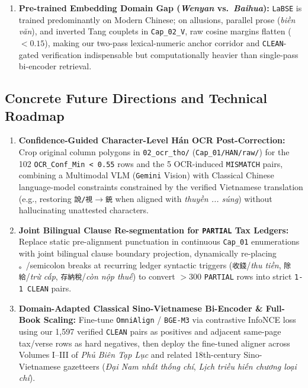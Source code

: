 \documentclass[a4paper]{article}
\begin{document}
\begin{enumerate}
  Among the 102 low-confidence Hán rows (\texttt{5.00\%}), our numeric/Moore-lexicon anchors still aligned \textbf{83/102 (81.37\%) as \texttt{CLEAN}} and \textbf{19/102 (18.63\%) as \texttt{PARTIAL}} (\textbf{0\% \texttt{MISMATCH}}). Nevertheless, glyph substitutions on rare boat names (\texttt{銃}$\to$\texttt{說/視/鏡}) cap fine-splitting granularity in \texttt{Cap\_01} pp.\,33--40 and degrade downstream lexical lookup if left uncorrected at character level.
  \item \textbf{Pre-trained Embedding Domain Gap (\textit{Wenyan} vs.\ \textit{Baihua}):}
  \texttt{LaBSE} is trained predominantly on Modern Chinese; on allusions, parallel prose (\textit{biền văn}), and inverted Tang couplets in \texttt{Cap\_02\_V}, raw cosine margins flatten ($<0.15$), making our two-pass lexical-numeric anchor corridor and \texttt{CLEAN}-gated verification indispensable but computationally heavier than single-pass bi-encoder retrieval.
\end{enumerate}

\subsection{Concrete Future Directions and Technical Roadmap}
\begin{enumerate}
  \item \textbf{Confidence-Guided Character-Level Hán OCR Post-Correction:} Crop original column polygons in \texttt{02\_ocr\_tho/} (\texttt{Cap\_01/HAN/raw/}) for the 102 \texttt{OCR\_Conf\_Min < 0.55} rows and the 5 OCR-induced \texttt{MISMATCH} pairs, combining a Multimodal VLM (\texttt{Gemini} Vision) with Classical Chinese language-model constraints constrained by the verified Vietnamese translation (e.g., restoring \texttt{說/視}$\to$\texttt{銃} when aligned with \textit{thuyền ... súng}) without hallucinating unattested characters.
  \item \textbf{Joint Bilingual Clause Re-segmentation for \texttt{PARTIAL} Tax Ledgers:} Replace static pre-alignment punctuation in continuous \texttt{Cap\_01} enumerations with joint bilingual clause boundary projection, dynamically re-placing \texttt{。}/semicolon breaks at recurring ledger syntactic triggers (\texttt{收錢}/\textit{thu tiền}, \texttt{除給}/\textit{trừ cấp}, \texttt{存納稅}/\textit{còn nộp thuế}) to convert $>300$ \texttt{PARTIAL} rows into strict \texttt{1-1 CLEAN} pairs.
  \item \textbf{Domain-Adapted Classical Sino-Vietnamese Bi-Encoder \& Full-Book Scaling:} Fine-tune \texttt{OmniAlign} / \texttt{BGE-M3} via contrastive InfoNCE loss using our 1,597 verified \texttt{CLEAN} pairs as positives and adjacent same-page tax/verse rows as hard negatives, then deploy the fine-tuned aligner across Volumes I--III of \textit{Phủ Biên Tạp Lục} and related 18th-century Sino-Vietnamese gazetteers (\textit{Đại Nam nhất thống chí}, \textit{Lịch triều hiến chương loại chí}).
\end{enumerate}
\end{document}

